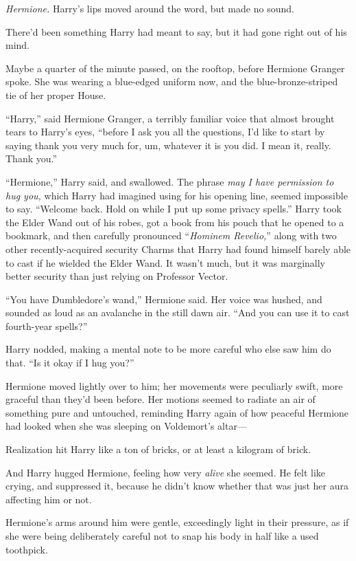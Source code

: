 \emph{Hermione.} Harry’s lips moved around the word, but made no sound.

There’d been something Harry had meant to say, but it had gone right out of his mind.

Maybe a quarter of the minute passed, on the rooftop, before Hermione Granger spoke. She was wearing a blue-edged uniform now, and the blue-bronze-striped tie of her proper House.

“Harry,” said Hermione Granger, a terribly familiar voice that almost brought tears to Harry’s eyes, “before I ask you all the questions, I’d like to start by saying thank you very much for, um, whatever it is you did. I mean it, really. Thank you.”

“Hermione,” Harry said, and swallowed. The phrase \emph{may I have permission to hug you,} which Harry had imagined using for his opening line, seemed impossible to say. “Welcome back. Hold on while I put up some privacy spells.” Harry took the Elder Wand out of his robes, got a book from his pouch that he opened to a bookmark, and then carefully pronounced “\emph{Hominem Revelio,}” along with two other recently-acquired security Charms that Harry had found himself barely able to cast if he wielded the Elder Wand. It wasn’t much, but it was marginally better security than just relying on Professor Vector.

“You have Dumbledore’s wand,” Hermione said. Her voice was hushed, and sounded as loud as an avalanche in the still dawn air. “And you can use it to cast fourth-year spells?”

Harry nodded, making a mental note to be more careful who else saw him do that. “Is it okay if I hug you?”

Hermione moved lightly over to him; her movements were peculiarly swift, more graceful than they’d been before. Her motions seemed to radiate an air of something pure and untouched, reminding Harry again of how peaceful Hermione had looked when she was sleeping on Voldemort’s altar—

Realization hit Harry like a ton of bricks, or at least a kilogram of brick.

And Harry hugged Hermione, feeling how very \emph{alive} she seemed. He felt like crying, and suppressed it, because he didn’t know whether that was just her aura affecting him or not.

Hermione’s arms around him were gentle, exceedingly light in their pressure, as if she were being deliberately careful not to snap his body in half like a used toothpick.

